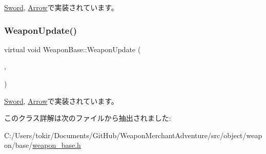 \mbox{\hyperlink{class_sword_aa145196b7a7f01fd6fb6d4e323451b06}{Sword}}, \mbox{\hyperlink{class_arrow_a0bdc2c0f450a1c6f4d38e49fdfd60a88}{Arrow}}で実装されています。

\mbox{\label{class_weapon_base_a389110ad7653d16eecfd9770a8b6b08e}} 
\subsubsection{\texorpdfstring{Weapon\+Update()}{WeaponUpdate()}}
{\footnotesize\ttfamily virtual void Weapon\+Base\+::\+Weapon\+Update (\begin{DoxyParamCaption}\item[{const \mbox{\hyperlink{common_8h_afb0c5e21d4133ff4f200992c0b534e1b}{V\+E\+C2}} \&}]{,  }\item[{bool}]{ }\end{DoxyParamCaption})\hspace{0.3cm}{\ttfamily [pure virtual]}}



\mbox{\hyperlink{class_sword_a11b6e50545688b52175a7089c61ac168}{Sword}}, \mbox{\hyperlink{class_arrow_a00f34c3153e0b2dc50259b8a249ee8ad}{Arrow}}で実装されています。



このクラス詳解は次のファイルから抽出されました\+:\begin{DoxyCompactItemize}
\item 
C\+:/\+Users/tokir/\+Documents/\+Git\+Hub/\+Weapon\+Merchant\+Adventure/src/object/weapon/base/\mbox{\hyperlink{weapon__base_8h}{weapon\+\_\+base.\+h}}\end{DoxyCompactItemize}
